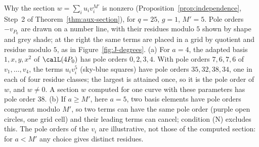 \caption{Why the section $w=\sum_iu_iv_i^{M'}$ is nonzero
(Proposition~\ref{prop:independence}, Step~2 of
Theorem~\ref{thm:aux-section}), for $q=25$, $g=1$, $M'=5$. Pole orders
$-v_{P_0}$ are drawn on a number line, with their residues modulo $5$ shown
by shape and grey shade; at the right the same terms are placed in a grid by
quotient and residue modulo $5$, as in Figure~\ref{fig:J-degrees}. (a) For
$a=4$, the adapted basis $1,x,y,x^2$ of $\calL(4P_0)$ has pole orders
$0,2,3,4$. With pole orders $7,6,7,6$ of $v_1,\dots,v_4$, the terms
$u_iv_i^5$ (sky-blue squares) have pole orders $35,32,38,34$, one in each of
four residue classes; the largest is attained once, so it is the pole order
of $w$, and $w\ne0$. A section $w$ computed for one curve with these
parameters has pole order $38$. (b) If $a\ge M'$, here $a=5$, two basis
elements have pole orders congruent modulo $M'$, so two terms can have the
same pole order (purple open circles, one grid cell) and their leading terms
can cancel; condition (N) excludes this. The pole orders of the $v_i$ are
illustrative, not those of the computed section: for $a<M'$ any choice gives
distinct residues.}
\label{fig:residues}
